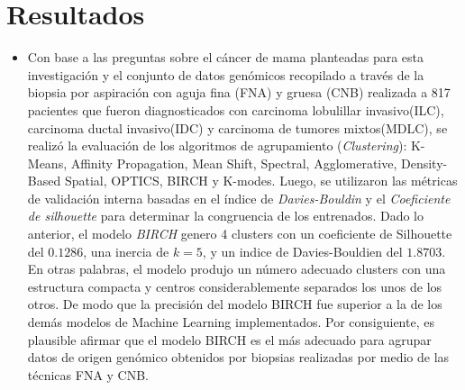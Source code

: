\section{Resultados}
\begin{itemize}[label=\HandPencilLeft]
	\item Con base a las preguntas sobre el cáncer de mama planteadas para esta investigación y el conjunto de datos genómicos recopilado a través de la biopsia por aspiración con aguja fina (FNA) y gruesa (CNB) realizada a 817 pacientes que fueron diagnosticados con carcinoma lobulillar invasivo(ILC), carcinoma ductal invasivo(IDC) y carcinoma de tumores mixtos(MDLC), se realizó la evaluación de  los algoritmos de agrupamiento (\textit{Clustering}): K-Means, Affinity Propagation, Mean Shift, Spectral, Agglomerative, Density-Based Spatial, OPTICS, BIRCH y K-modes. Luego, se utilizaron las métricas de validación interna basadas en el índice de \textit{Davies-Bouldin} y el \textit{Coeficiente de silhouette} para determinar la congruencia de los  entrenados. Dado lo anterior, el modelo \textit{BIRCH} genero 4 clusters con un coeficiente de Silhouette del $0.1286$, una inercia de $k = 5 $, y un indice de Davies-Bouldien del $1.8703$. En otras palabras, el modelo produjo un número adecuado clusters con una estructura compacta y centros considerablemente separados los unos de los otros. De modo que la precisión del modelo BIRCH fue superior a la de los demás modelos de Machine Learning implementados. Por consiguiente, es plausible afirmar que el modelo BIRCH es el más adecuado para agrupar datos de origen genómico obtenidos por biopsias realizadas por medio de las técnicas FNA y CNB.
\end{itemize}


